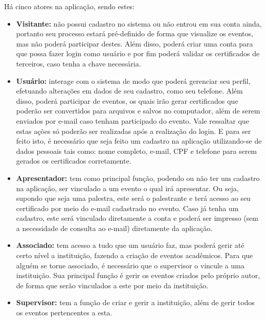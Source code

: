 
Há cinco atores na aplicação, sendo estes:
\begin{itemize}
    \item \textbf{Visitante: } não possui cadastro no sistema ou não entrou em sua conta ainda, portanto seu processo estará pré-definido de forma que visualize os eventos, mas não poderá participar destes. Além disso, poderá criar uma conta para que possa fazer login como usuário e por fim poderá validar os certificados de terceiros, caso tenha a chave necessária.
    \item \textbf{Usuário: }interage com o sistema de modo que poderá gerenciar seu perfil, efetuando alterações em dados de seu cadastro, como seu telefone. Além disso, poderá participar de eventos, os quais irão gerar certificados que poderão ser convertidos para arquivos e salvos no computador, além de serem enviados por e-mail caso tenham participado do evento. Vale ressaltar que estas ações só poderão ser realizadas após a realização do login. E para ser feito isto, é necessário que seja feito um cadastro na aplicação utilizando-se de dados pessoais tais como: nome completo, e-mail, CPF e telefone para serem gerados os certificados corretamente. 
    \item \textbf{Apresentador: }tem como principal função, podendo ou não ter um cadastro na aplicação, ser vinculado a um evento o qual irá apresentar. Ou seja, supondo que seja uma palestra, este será o palestrante e terá acesso ao seu certificado por meio do e-mail cadastrado no evento. Caso já tenha um cadastro, este será vinculado diretamente a conta e poderá ser impresso (sem a necessidade de consulta ao e-mail) diretamente da aplicação.
    \item \textbf{Associado: }tem acesso a tudo que um usuário faz, mas poderá gerir até certo nível a instituição, fazendo a criação de eventos acadêmicos. Para que alguém se torne associado, é necessário que o supervisor o vincule a uma instituição. Sua principal função é gerir os eventos criados pelo próprio autor, de forma que serão vinculados a este por meio da instituição.
    \item \textbf{Supervisor: }tem a função de criar e gerir a instituição, além de gerir todos os eventos pertencentes a esta.
\end{itemize}


